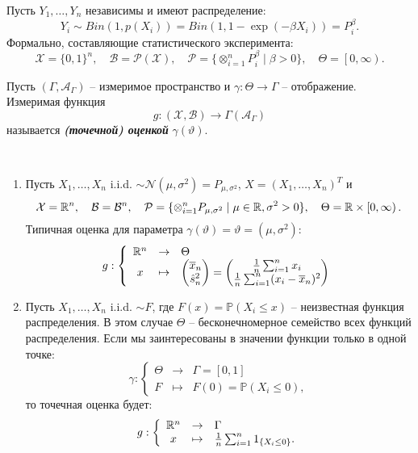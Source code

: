 \begin{exmp}
	Пусть $Y_1, \dots, Y_n$ независимы и имеют распределение:
	\[Y_i \sim Bin(1, p(X_i))=Bin(1, 1-\exp(-\beta X_i))=P_i^{\beta}.\]
	Формально, составляющие статистического эксперимента:
	\[ \mathcal{X}=\{ 0, 1 \}^n, \quad \mathcal{B}=\mathcal{P(X)}, \quad \mathcal{P}=\{\otimes_{i=1}^nP_i^{\beta} \mid \beta>0 \}, \quad \Theta=\left[0, \infty\right).  \]
\end{exmp}

\begin{defn}
	Пусть $(\Gamma, \mathcal{A}_\Gamma)$ -- измеримое пространство и $\gamma: \Theta \rightarrow \Gamma$ -- отображение. Измеримая функция
	\[g:(\mathcal{X}, \mathcal{B}) \rightarrow \Gamma(\mathcal{A}_\Gamma)  \]
	называется \textbf{\textit{(точечной) оценкой}} $\gamma(\vartheta)$.
\end{defn}

\begin{exmp} \label{exmp2.7}\
	
	\begin{enumerate}
		\item Пусть $X_1, \dots , X_n$ i.i.d. $\sim \mathcal{N}(\mu, \sigma^2)=P_{\mu, \sigma^2}$, $X=(X_1, \dots , X_n)^T$ и
		\[\mathcal{X}=\mathbb{R}^n, \quad \mathcal{B}=\mathcal{B}^n, \quad \mathcal{P}=\{\otimes_{i=1}^nP_{\mu, \sigma^2} \mid \mu \in \mathbb{R}, \sigma^2>0 \}, \quad \Theta=\mathbb{R} \times \left[0, \infty\right).\]
		Типичная оценка для параметра $\gamma(\vartheta)=\vartheta=(\mu, \sigma^2)$:
		\[ g :
		\left \{
		\begin{array}{ccl}
		\mathbb{R}^n & \rightarrow & \Theta \\
		x & \mapsto &\begin{pmatrix} \overline{x}_n \\ \hat{s}_n^2 \end{pmatrix} = \begin{pmatrix} \frac{1}{n} \sum_{i=1}^n x_i \\ \frac{1}{n} \sum_{i=1}^n (x_i-\overline{x}_n)^2 \end{pmatrix}
		\end{array}
		\right.
		\]
		\item Пусть $X_1, \dots , X_n$ i.i.d. $\sim F$, где $F(x)=\mathbb{P}(X_i \leq x)$ -- неизвестная функция распределения. В этом случае $\Theta$ -- бесконечномерное семейство всех функций распределения. Если мы заинтересованы в значении функции только в одной точке:
		\[ \gamma :
		\left \{
		\begin{array}{ccl}
		\Theta & \rightarrow & \Gamma=\left[0,1\right] \\
		F & \mapsto & F(0)=\mathbb{P}(X_i \leq 0),
		\end{array}
		\right.
		\]
		то точечная оценка будет:
		\[ g :
		\left \{
		\begin{array}{ccl}
		\mathbb{R}^n & \rightarrow & \Gamma \\
		x & \mapsto & \frac{1}{n} \sum_{i=1}^n 1_{\{X_i \leq 0\}}.
		\end{array}
		\right.
		\]
	\end{enumerate}
\end{exmp}

